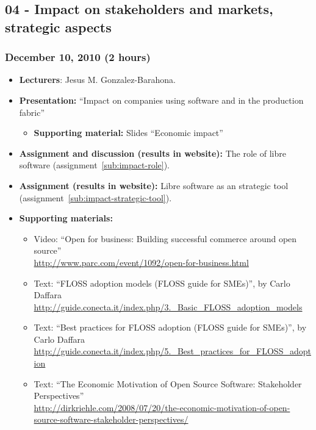 \documentclass[a4paper]{article}
\begin{document}
\subsection{04 - Impact on stakeholders and markets, strategic aspects}

\subsubsection{December 10, 2010 (2 hours)}

\begin{itemize}
\item \textbf{Lecturers}: Jesus M. Gonzalez-Barahona.
\item \textbf{Presentation:} ``Impact on companies using software and in the production fabric''
  \begin{itemize}
  \item \textbf{Supporting material:} Slides ``Economic impact''
  \end{itemize}
\item \textbf{Assignment and discussion (results in website):} The role of libre software (assignment~\ref{sub:impact-role}).
\item \textbf{Assignment (results in website):} Libre software as an strategic tool  (assignment~\ref{sub:impact-strategic-tool}).
\item \textbf{Supporting materials:} 
  \begin{itemize}
  \item Video: ``Open for business: Building successful commerce around open source'' \\
    \url{http://www.parc.com/event/1092/open-for-business.html}
  \item Text: ``FLOSS adoption models (FLOSS guide for SMEs)'', by Carlo Daffara \\
    \url{http://guide.conecta.it/index.php/3._Basic_FLOSS_adoption_models}
  \item Text: ``Best practices for FLOSS adoption (FLOSS guide for SMEs)'', by Carlo Daffara \\
    \url{http://guide.conecta.it/index.php/5._Best_practices_for_FLOSS_adoption}
  \item Text: ``The Economic Motivation of Open Source Software: Stakeholder Perspectives'' \\
    \url{http://dirkriehle.com/2008/07/20/the-economic-motivation-of-open-source-software-stakeholder-perspectives/}
  \end{itemize}
  
\end{itemize}
\end{document}
